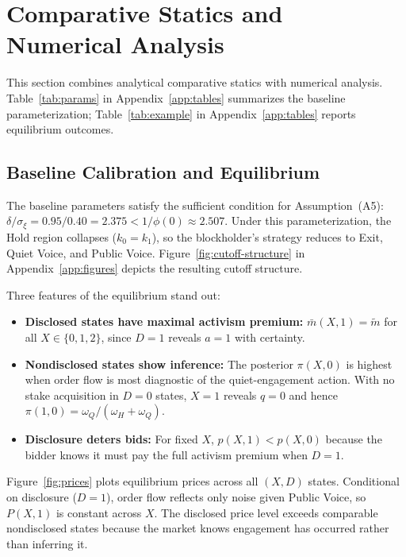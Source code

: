 \documentclass[11pt]{article}
\newcommand{\1}{\mathbf{1}}
\begin{document}
\section{Comparative Statics and Numerical Analysis}
\label{sec:numerical}
\label{sec:comp-statics}

This section combines analytical comparative statics with numerical analysis. Table~\ref{tab:params} in Appendix~\ref{app:tables} summarizes the baseline parameterization; Table~\ref{tab:example} in Appendix~\ref{app:tables} reports equilibrium outcomes.

%
\subsection{Baseline Calibration and Equilibrium}
%

The baseline parameters satisfy the sufficient condition for Assumption~\textup{(A5)}: $\delta/\sigma_\xi = 0.95/0.40 = 2.375 < 1/\phi(0) \approx 2.507$. Under this parameterization, the Hold region collapses ($k_0=k_1$), so the blockholder's strategy reduces to Exit, Quiet Voice, and Public Voice. Figure~\ref{fig:cutoff-structure} in Appendix~\ref{app:figures} depicts the resulting cutoff structure.

Three features of the equilibrium stand out:
\begin{itemize}[leftmargin=2em,itemsep=2pt]
\item \textbf{Disclosed states have maximal activism premium:} $\bar{m}(X,1) = \tilde{m}$ for all $X \in \{0,1,2\}$, since $D=1$ reveals $a=1$ with certainty.
\item \textbf{Nondisclosed states show inference:} The posterior $\pi(X,0)$ is highest when order flow is most diagnostic of the quiet-engagement action. With no stake acquisition in $D=0$ states, $X=1$ reveals $q=0$ and hence $\pi(1,0)=\omega_Q/(\omega_H+\omega_Q)$.
\item \textbf{Disclosure deters bids:} For fixed $X$, $p(X,1) < p(X,0)$ because the bidder knows it must pay the full activism premium when $D=1$.
\end{itemize}

Figure~\ref{fig:prices} plots equilibrium prices across all $(X,D)$ states. Conditional on disclosure ($D=1$), order flow reflects only noise given Public Voice, so $P(X,1)$ is constant across $X$. The disclosed price level exceeds comparable nondisclosed states because the market knows engagement has occurred rather than inferring it.
\end{document}
